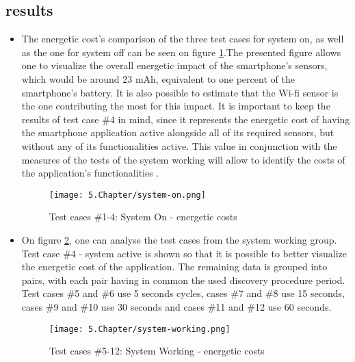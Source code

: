   
  
  
\subsection{results}  
\label{subsec:results}  
  
  
\begin{itemize}  
  
\item The energetic cost's comparison of the three test cases for system on, as well as the one for system off can be seen on figure \ref{fig:syson}.The presented figure allows one to visualize the overall energetic impact of the smartphone's sensors, which would be around 23 mAh, equivalent to one percent of the smartphone's battery. It is also possible to estimate that the Wi-fi sensor is the one contributing the most for this impact.   
It is important to keep the results of test case \#4 in mind, since it represents the energetic cost of having the smartphone application active alongside all of its required sensors, but without any of its functionalities active. This value in conjunction with the measures of the tests of the system working will allow to identify the costs of the application's functionalities .  
 
 
\begin{figure} [H] 
\centering  
\texttt{[image: 5.Chapter/system-on.png]}  
\caption[Test cases \#1-4: System On - energetic costs]{Test cases \#1-4: System On - energetic costs}  
\label{fig:syson}  
\end{figure}   
  
 
 
  
  
\item On figure \ref{fig:syswork}, one can analyse the test cases from the system working group. Test case \#4 - system active is shown so that it is possible to better visualize the energetic cost of the application. The remaining data is grouped into pairs, with each pair having in common the used discovery procedure period. Test cases \#5 and \#6 use 5 seconds cycles, cases \#7 and \#8 use 15 seconds, cases \#9 and \#10 use 30 seconds and cases \#11 and \#12 use 60 seconds.  
  
\begin{figure}[H] 
\centering  
\texttt{[image: 5.Chapter/system-working.png]}  
\caption[Test cases \#5-12: System Working - energetic costs]{Test cases \#5-12: System Working - energetic costs}  
\label{fig:syswork}  
\end{figure}  
  

\end{itemize}

